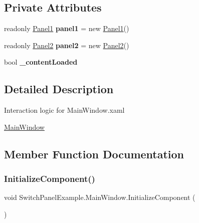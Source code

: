 \subsection*{Private Attributes}
\begin{DoxyCompactItemize}
\item 
\mbox{\label{class_switch_panel_example_1_1_main_window_a7fabcc8ea419b73573348e3f8665623c}} 
readonly \mbox{\hyperlink{class_switch_panel_example_1_1_panel1}{Panel1}} {\bfseries panel1} = new \mbox{\hyperlink{class_switch_panel_example_1_1_panel1}{Panel1}}()
\item 
\mbox{\label{class_switch_panel_example_1_1_main_window_a22ee818b6a229a58eb45f2fc7e2c8ad4}} 
readonly \mbox{\hyperlink{class_switch_panel_example_1_1_panel2}{Panel2}} {\bfseries panel2} = new \mbox{\hyperlink{class_switch_panel_example_1_1_panel2}{Panel2}}()
\item 
\mbox{\label{class_switch_panel_example_1_1_main_window_aa6a81f4581a6146ddbe41bee94fe6a47}} 
bool {\bfseries \+\_\+content\+Loaded}
\end{DoxyCompactItemize}


\subsection{Detailed Description}
Interaction logic for Main\+Window.\+xaml 

\mbox{\hyperlink{class_switch_panel_example_1_1_main_window}{Main\+Window}} 

\subsection{Member Function Documentation}
\mbox{\label{class_switch_panel_example_1_1_main_window_a3d4e6b790ce13b64383a1c330cc19878}} 
\subsubsection{\texorpdfstring{Initialize\+Component()}{InitializeComponent()}\hspace{0.1cm}{\footnotesize\ttfamily [1/2]}}
{\footnotesize\ttfamily void Switch\+Panel\+Example.\+Main\+Window.\+Initialize\+Component (\begin{DoxyParamCaption}{ }\end{DoxyParamCaption})}



